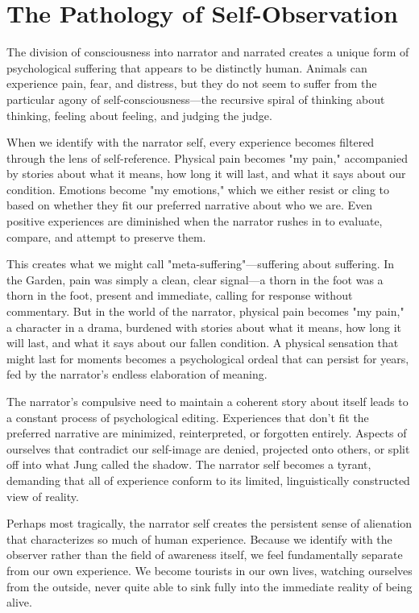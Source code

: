 \section{The Pathology of Self-Observation}

The division of consciousness into narrator and narrated creates a unique form of psychological suffering that appears to be distinctly human. Animals can experience pain, fear, and distress, but they do not seem to suffer from the particular agony of self-consciousness—the recursive spiral of thinking about thinking, feeling about feeling, and judging the judge.

When we identify with the narrator self, every experience becomes filtered through the lens of self-reference. Physical pain becomes "my pain," accompanied by stories about what it means, how long it will last, and what it says about our condition. Emotions become "my emotions," which we either resist or cling to based on whether they fit our preferred narrative about who we are. Even positive experiences are diminished when the narrator rushes in to evaluate, compare, and attempt to preserve them.

This creates what we might call "meta-suffering"—suffering about suffering. In the Garden, pain was simply a clean, clear signal—a thorn in the foot was a thorn in the foot, present and immediate, calling for response without commentary. But in the world of the narrator, physical pain becomes "my pain," a character in a drama, burdened with stories about what it means, how long it will last, and what it says about our fallen condition. A physical sensation that might last for moments becomes a psychological ordeal that can persist for years, fed by the narrator's endless elaboration of meaning.

The narrator's compulsive need to maintain a coherent story about itself leads to a constant process of psychological editing. Experiences that don't fit the preferred narrative are minimized, reinterpreted, or forgotten entirely. Aspects of ourselves that contradict our self-image are denied, projected onto others, or split off into what Jung called the shadow. The narrator self becomes a tyrant, demanding that all of experience conform to its limited, linguistically constructed view of reality.

Perhaps most tragically, the narrator self creates the persistent sense of alienation that characterizes so much of human experience. Because we identify with the observer rather than the field of awareness itself, we feel fundamentally separate from our own experience. We become tourists in our own lives, watching ourselves from the outside, never quite able to sink fully into the immediate reality of being alive.

